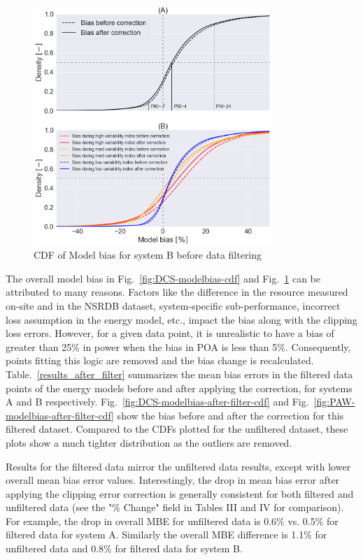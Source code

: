 \documentclass[conference]{IEEEtran}
\begin{document}
\begin{figure}[htbp]
\centerline{\includegraphics[width=9cm]{PAW_ModelBias_breakdown_CDF_v4.png}}
\caption{CDF of Model bias for system B before data filtering}
\label{fig:PAW-modelbias-cdf}
\end{figure}

The overall model bias in Fig.~\ref{fig:DCS-modelbias-cdf} and Fig.~\ref{fig:PAW-modelbias-cdf} can be attributed to many reasons. Factors like the difference in the resource measured on-site and in the NSRDB dataset, system-specific sub-performance, incorrect loss assumption in the energy model, etc., impact the bias along with the clipping loss errors. However, for a given data point, it is unrealistic to have a bias of greater than 25\% in power when the bias in POA is less than 5\%. Consequently, points fitting this logic are removed and the bias change is recalculated. Table.~\ref{results_after_filter} summarizes the mean bias errors in the filtered data points of the energy models before and after applying the correction, for systems A and B respectively. Fig.~\ref{fig:DCS-modelbias-after-filter-cdf} and Fig.~\ref{fig:PAW-modelbias-after-filter-cdf} show the bias before and after the correction for this filtered dataset. Compared to the CDFs plotted for the unfiltered dataset, these plots show a much tighter distribution as the outliers are removed. 

Results for the filtered data mirror the unfiltered data results, except with lower overall mean bias error values. Interestingly, the drop in mean bias error after applying the clipping error correction is generally consistent for both filtered and unfiltered data (see the "\% Change" field in Tables III and IV for comparison). For example, the drop in overall MBE for unfiltered data is 0.6\% vs. 0.5\% for filtered data for system A. Similarly the overall MBE difference is 1.1\% for unfiltered data and 0.8\% for filtered data for system B.  
\end{document}
